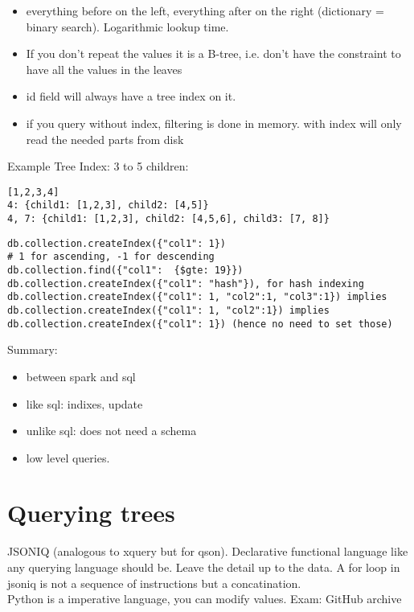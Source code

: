 \begin{itemize}
\begin{itemize}
\begin{itemize}
            \item everything before on the left, everything after on the right (dictionary = binary search).
            Logarithmic lookup time.
            \item If you don't repeat the values it is a B-tree, i.e. don't have the constraint to have all the values in the leaves
            \item id field will always have a tree index on it.
            \item if you query without index, filtering is done in memory. with index will only read
            the needed parts from disk
        \end{itemize}
    \end{itemize}
\end{itemize}

Example Tree Index: 3 to 5 children:
\begin{lstlisting}
[1,2,3,4]
4: {child1: [1,2,3], child2: [4,5]}
4, 7: {child1: [1,2,3], child2: [4,5,6], child3: [7, 8]}
\end{lstlisting}


\begin{lstlisting}
db.collection.createIndex({"col1": 1})
# 1 for ascending, -1 for descending
db.collection.find({"col1":  {$gte: 19}})
db.collection.createIndex({"col1": "hash"}), for hash indexing
db.collection.createIndex({"col1": 1, "col2":1, "col3":1}) implies
db.collection.createIndex({"col1": 1, "col2":1}) implies
db.collection.createIndex({"col1": 1}) (hence no need to set those)
\end{lstlisting}


Summary:
\begin{itemize}
    \item between spark and sql
    \item like sql: indixes, update
    \item unlike sql: does not need a schema
    \item low level queries.
\end{itemize}

\section{Querying trees}
JSONIQ (analogous to xquery but for qson).
Declarative functional language like any querying language should be. Leave the detail up to the data.
A for loop in jsoniq is not a sequence of instructions but a concatination. \\
Python is a imperative language, you can modify values.
Exam: GitHub archive

